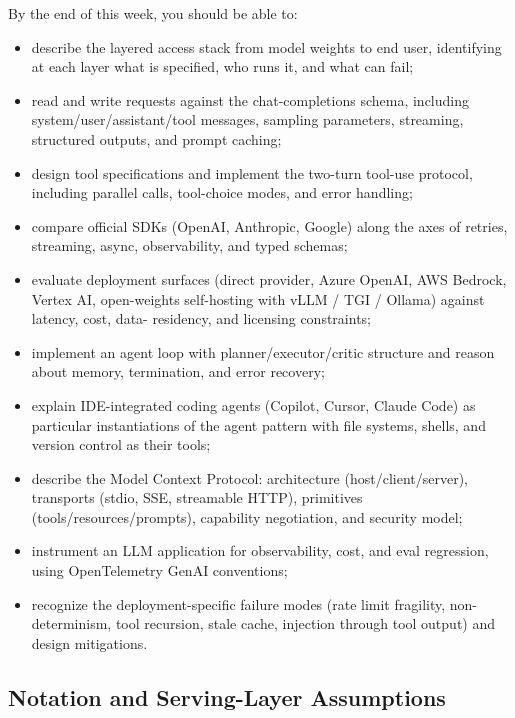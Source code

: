 By the end of this week, you should be able to:
\begin{itemize}
  \item describe the layered access stack from model weights to
        end user, identifying at each layer what is specified,
        who runs it, and what can fail;
  \item read and write requests against the chat-completions
        schema, including system/user/assistant/tool messages,
        sampling parameters, streaming, structured outputs, and
        prompt caching;
  \item design tool specifications and implement the two-turn
        tool-use protocol, including parallel calls, tool-choice
        modes, and error handling;
  \item compare official SDKs (OpenAI, Anthropic, Google) along
        the axes of retries, streaming, async, observability, and
        typed schemas;
  \item evaluate deployment surfaces (direct provider, Azure
        OpenAI, AWS Bedrock, Vertex AI, open-weights self-hosting
        with vLLM / TGI / Ollama) against latency, cost, data-
        residency, and licensing constraints;
  \item implement an agent loop with planner/executor/critic
        structure and reason about memory, termination, and error
        recovery;
  \item explain IDE-integrated coding agents (Copilot, Cursor,
        Claude Code) as particular instantiations of the agent
        pattern with file systems, shells, and version control as
        their tools;
  \item describe the Model Context Protocol: architecture
        (host/client/server), transports (stdio, SSE, streamable
        HTTP), primitives (tools/resources/prompts), capability
        negotiation, and security model;
  \item instrument an LLM application for observability, cost,
        and eval regression, using OpenTelemetry GenAI
        conventions;
  \item recognize the deployment-specific failure modes (rate
        limit fragility, non-determinism, tool recursion, stale
        cache, injection through tool output) and design
        mitigations.
\end{itemize}

\subsection{Notation and Serving-Layer Assumptions}
\label{sec:wk11_notation}


